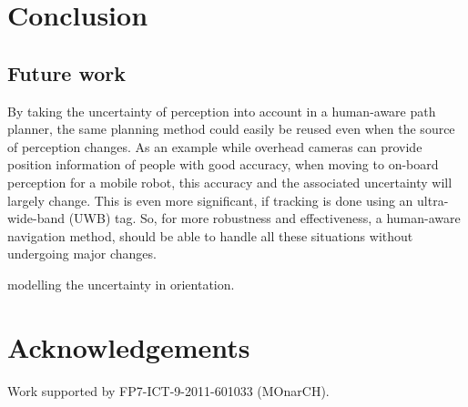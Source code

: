 \section{Conclusion}
\label{sec:conclusion}

\subsection{Future work}


By taking the uncertainty of perception into account in a human-aware path planner, the same planning method could easily be reused even when the source of perception changes. As an example while overhead cameras can provide position information of people with good accuracy, when moving to on-board perception for a mobile robot, this accuracy and the associated uncertainty will largely change. This is even more significant, if tracking is done using an ultra-wide-band (UWB) tag. So, for more robustness and effectiveness, a human-aware navigation method, should be able to handle all these situations without undergoing major changes. 

modelling the uncertainty in orientation.


\section*{Acknowledgements}

Work supported by FP7-ICT-9-2011-601033 (MOnarCH).